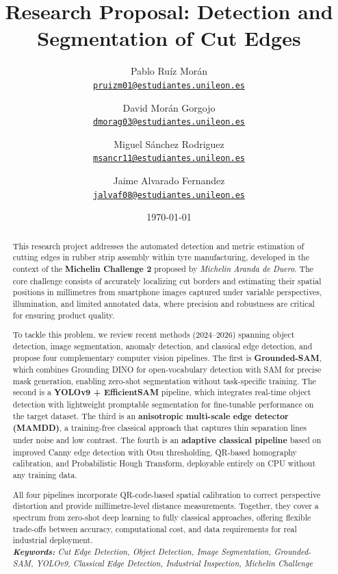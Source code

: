 \documentclass[11pt]{article}
\title{Research Proposal: Detection and Segmentation of Cut Edges
}
\author{
    Pablo Ruíz Morán \\
    \href{mailto:pruizm01@estudiantes.unileon.es}{\texttt{pruizm01@estudiantes.unileon.es}}
    \and
    David Morán Gorgojo \\
    \href{mailto:dmorag03@estudiantes.unileon.es}{\texttt{dmorag03@estudiantes.unileon.es}}
    \and
    Miguel Sánchez Rodriguez \\
    \href{mailto:msancr11@estudiantes.unileon.es}{\texttt{msancr11@estudiantes.unileon.es}}
    \and
    Jaime Alvarado Fernandez \\
    \href{mailto:jalvaf08@estudiantes.unileon.es}{\texttt{jalvaf08@estudiantes.unileon.es}}
}
\date{\today}
\begin{document}
{
\maketitle
\begin{abstract}
This research project addresses the automated detection and metric estimation of 
cutting edges in rubber strip assembly within tyre manufacturing, developed in the 
context of the \textbf{Michelin Challenge 2} proposed by \textit{Michelin Aranda de 
Duero}. The core challenge consists of accurately localizing cut borders and 
estimating their spatial positions in millimetres from smartphone images captured 
under variable perspectives, illumination, and limited annotated data, where 
precision and robustness are critical for ensuring product quality.

To tackle this problem, we review recent methods (2024--2026) spanning object 
detection, image segmentation, anomaly detection, and classical edge detection, and 
propose four complementary computer vision pipelines. The first is 
\textbf{Grounded-SAM}, which combines Grounding DINO for open-vocabulary detection 
with SAM for precise mask generation, enabling zero-shot segmentation without 
task-specific training. The second is a \textbf{YOLOv9 + EfficientSAM} pipeline, 
which integrates real-time object detection with lightweight promptable segmentation 
for fine-tunable performance on the target dataset. The third is an 
\textbf{anisotropic multi-scale edge detector (MAMDD)}, a training-free classical 
approach that captures thin separation lines under noise and low contrast. The fourth 
is an \textbf{adaptive classical pipeline} based on improved Canny edge detection 
with Otsu thresholding, QR-based homography calibration, and Probabilistic Hough 
Transform, deployable entirely on CPU without any training data.

All four pipelines incorporate QR-code-based spatial calibration to correct 
perspective distortion and provide millimetre-level distance measurements. Together, 
they cover a spectrum from zero-shot deep learning to fully classical approaches, 
offering flexible trade-offs between accuracy, computational cost, and data 
requirements for real industrial deployment.\\

\textit{\textbf{Keywords: } Cut Edge Detection, Object Detection, Image Segmentation, 
Grounded-SAM, YOLOv9, Classical Edge Detection, Industrial Inspection, Michelin 
Challenge}

\end{abstract}
}
\end{document}
